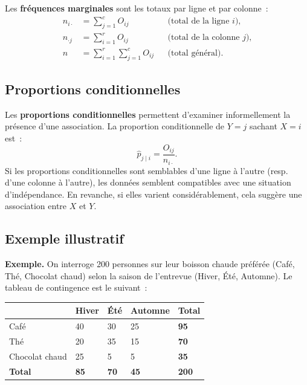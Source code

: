 \documentclass[11pt,french]{article}
\begin{document}
Les \textbf{fréquences marginales} sont les totaux par ligne et par colonne~:
\begin{align*}
  n_{i\cdot} &= \sum_{j=1}^{c} O_{ij}
    && \text{(total de la ligne } i\text{),}\\
  n_{\cdot j} &= \sum_{i=1}^{r} O_{ij}
    && \text{(total de la colonne } j\text{),}\\
  n &= \sum_{i=1}^{r} \sum_{j=1}^{c} O_{ij}
    && \text{(total général).}
\end{align*}

\subsection{Proportions conditionnelles}

Les \textbf{proportions conditionnelles} permettent d'examiner informellement la présence
d'une association. La proportion conditionnelle de $Y = j$ sachant $X = i$ est~:
\[
  \hat{p}_{j \mid i} = \frac{O_{ij}}{n_{i\cdot}}.
\]
Si les proportions conditionnelles sont semblables d'une ligne à l'autre (resp. d'une colonne
à l'autre), les données semblent compatibles avec une situation d'indépendance. En revanche,
si elles varient considérablement, cela suggère une association entre $X$ et $Y$.

\subsection{Exemple illustratif}

\textbf{Exemple.} On interroge 200 personnes sur leur boisson chaude préférée (Café, Thé,
Chocolat chaud) selon la saison de l'entrevue (Hiver, Été, Automne). Le tableau de contingence
est le suivant~:

\begin{center}
\renewcommand{\arraystretch}{1.6}
\begin{tabular}{|P{3cm}|P{2cm}|P{2cm}|P{2cm}|P{2cm}|}
\hline
{} & Hiver & Été & Automne & \textbf{Total} \\
\hline
Café          & 40 & 30 & 25 & \textbf{95} \\
\hline
Thé           & 20 & 35 & 15 & \textbf{70} \\
\hline
Chocolat chaud & 25 &  5 &  5 & \textbf{35} \\
\hline
\textbf{Total} & \textbf{85} & \textbf{70} & \textbf{45} & \textbf{200} \\
\hline
\end{tabular}
\end{center}
\end{document}
